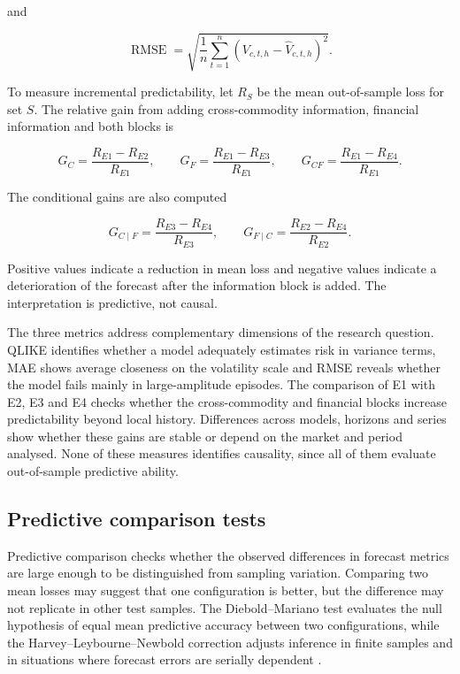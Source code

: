 \documentclass[a4paper,fleqn]{cas-sc}
\begin{document}
and

\begin{equation}
\operatorname{RMSE}
=
\sqrt{
\frac{1}{n}\sum_{t=1}^{n}
\left(V_{c,t,h}-\widehat{V}_{c,t,h}\right)^{2}
}.
\label{eq:rmse}
\end{equation}

To measure incremental predictability, let \(R_S\) be the mean out-of-sample loss for set \(S\). The relative gain from adding cross-commodity information, financial information and both blocks is

\begin{equation}
G_C=\frac{R_{E1}-R_{E2}}{R_{E1}},
\qquad
G_F=\frac{R_{E1}-R_{E3}}{R_{E1}},
\qquad
G_{CF}=\frac{R_{E1}-R_{E4}}{R_{E1}}.
\label{eq:incremental_gain}
\end{equation}

The conditional gains are also computed

\begin{equation}
G_{C\mid F}=\frac{R_{E3}-R_{E4}}{R_{E3}},
\qquad
G_{F\mid C}=\frac{R_{E2}-R_{E4}}{R_{E2}}.
\label{eq:conditional_gain}
\end{equation}

Positive values indicate a reduction in mean loss and negative values indicate a deterioration of the forecast after the information block is added. The interpretation is predictive, not causal.

The three metrics address complementary dimensions of the research question. QLIKE identifies whether a model adequately estimates risk in variance terms, MAE shows average closeness on the volatility scale and RMSE reveals whether the model fails mainly in large-amplitude episodes. The comparison of E1 with E2, E3 and E4 checks whether the cross-commodity and financial blocks increase predictability beyond local history. Differences across models, horizons and series show whether these gains are stable or depend on the market and period analysed. None of these measures identifies causality, since all of them evaluate out-of-sample predictive ability.

\subsection{Predictive comparison tests}
\label{subsec:dm_test}

Predictive comparison checks whether the observed differences in forecast metrics are large enough to be distinguished from sampling variation. Comparing two mean losses may suggest that one configuration is better, but the difference may not replicate in other test samples. The Diebold--Mariano test evaluates the null hypothesis of equal mean predictive accuracy between two configurations, while the Harvey--Leybourne--Newbold correction adjusts inference in finite samples and in situations where forecast errors are serially dependent \citep{DieboldMariano1995,HarveyLeybourneNewbold1997}.
\end{document}
